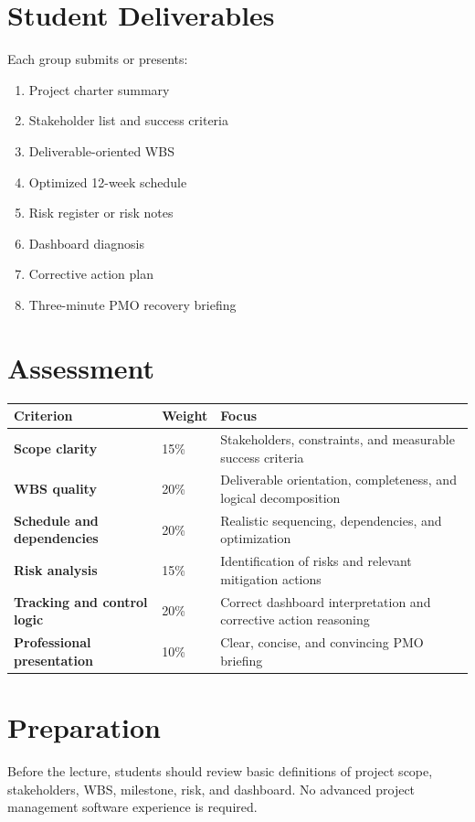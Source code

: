 \documentclass[11pt,a4paper]{article}
\begin{document}
\section*{Student Deliverables}

Each group submits or presents:

\begin{enumerate}
  \item Project charter summary
  \item Stakeholder list and success criteria
  \item Deliverable-oriented WBS
  \item Optimized 12-week schedule
  \item Risk register or risk notes
  \item Dashboard diagnosis
  \item Corrective action plan
  \item Three-minute PMO recovery briefing
\end{enumerate}

\section*{Assessment}

\begin{longtable}{>{\bfseries}p{6cm}p{3cm}p{5.3cm}}
\textbf{Criterion} & \textbf{Weight} & \textbf{Focus} \\
\hline
Scope clarity & 15\% & Stakeholders, constraints, and measurable success criteria \\
WBS quality & 20\% & Deliverable orientation, completeness, and logical decomposition \\
Schedule and dependencies & 20\% & Realistic sequencing, dependencies, and optimization \\
Risk analysis & 15\% & Identification of risks and relevant mitigation actions \\
Tracking and control logic & 20\% & Correct dashboard interpretation and corrective action reasoning \\
Professional presentation & 10\% & Clear, concise, and convincing PMO briefing \\
\end{longtable}

\section*{Preparation}

Before the lecture, students should review basic definitions of project scope, stakeholders, WBS, milestone, risk, and dashboard. No advanced project management software experience is required.
\end{document}
